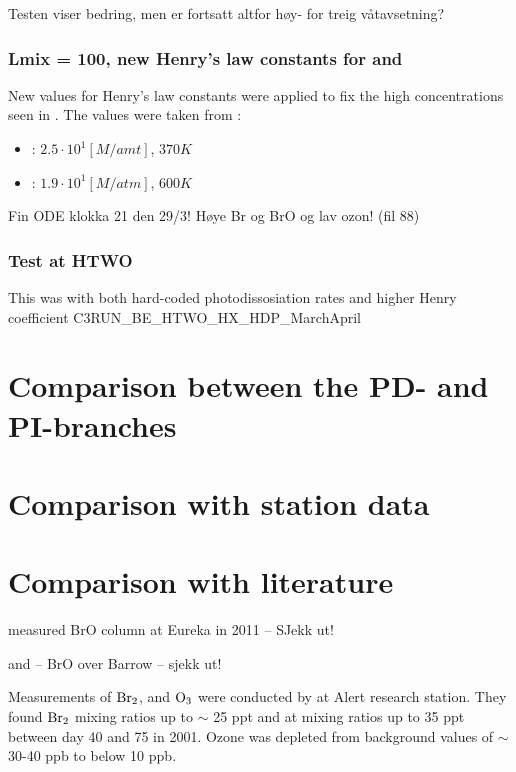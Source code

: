 Testen viser bedring, men  er fortsatt altfor høy- for treig våtavsetning? 

\subsubsection{Lmix = 100, new Henry's law constants for  and }

New values for Henry's law constants were applied to fix the high concentrations seen in . The values were taken from \cite{dean1999}:

\begin{itemize}
    \item {}: $2.5 \cdot 10^{1} [M/amt]$, $370 K$
    \item {}: $1.9\cdot10^1 [M/atm]$, $600 K$ 
\end{itemize}

Fin ODE klokka 21 den 29/3! Høye Br og BrO og lav ozon! (fil 88) 


\subsubsection{Test at HTWO}

This was with both hard-coded photodissosiation rates and higher Henry coefficient C3RUN\_BE\_HTWO\_HX\_HDP\_MarchApril

\section{Comparison between the PD- and PI-branches}

\section{Comparison with station data}

\section{Comparison with literature}

\cite{Zhao2016} measured BrO column at Eureka in 2011 -- SJekk ut! 


\cite{Peterson2016} and \cite{Peterson2015} -- BrO over Barrow -- sjekk ut! 

Measurements of $\mathrm{Br_2}$,  and $\mathrm{O_3}$ were conducted by \cite{Foster2001} at Alert research station. They found $\mathrm{Br_2}$ mixing ratios up to $\sim$ 25 \acrshort{ppt} and  at mixing ratios up to 35 \acrshort{ppt} between day 40 and 75 in 2001. Ozone was depleted from background values of $\sim$ 30-40 \acrshort{ppb} to below 10 ppb. 

